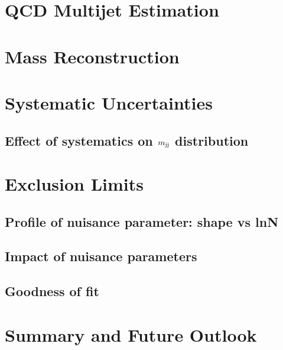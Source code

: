\chapter{QCD Multijet Estimation}
\label{s:secQCD}


\chapter{Mass Reconstruction}
\label{c:secMassReco}


\label{s:secMjjCat}

\chapter{Systematic Uncertainties}
\label{s:secSys}


\section{Effect of systematics on $m_\text{jj}$ distribution}
\label{a:appendSysMjj}


\chapter{Exclusion Limits}
\label{c:secLimit}


\section{Profile of nuisance parameter: shape vs lnN}
\label{a:secShapeVslnN}




\section{Impact of nuisance parameters}
\label{s:secNuisImpact}


\section{Goodness of fit}
\label{s:secGOF}


\chapter{Summary and Future Outlook}
\label{s:secConcl}

